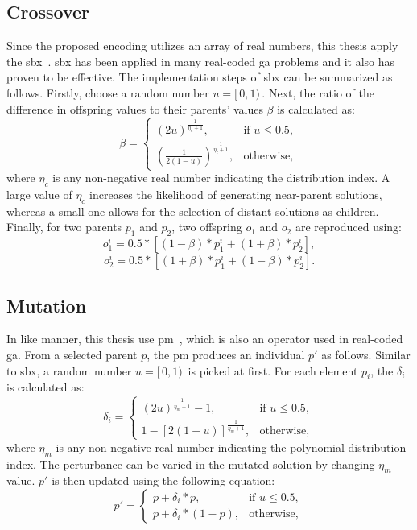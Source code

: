 \subsection{Crossover}
Since the proposed encoding utilizes an array of real numbers, this thesis apply the \gls{sbx}~\cite{deb1995simulated}. \gls{sbx} has been applied in many real-coded \gls{ga} problems and it also has proven to be effective. The implementation steps of \gls{sbx} can be summarized as follows. Firstly, choose a random number $u = [ \, 0, 1) \,$. Next, the ratio of the difference in offspring values to their parents' values $\beta$ is calculated as:
\begin{equation}
	\beta = 
	\begin{cases}
		(2u)^{\frac{1}{\eta_c + 1}}, & \text{if $u \leq 0.5$},\\
		(\frac{1}{2(1 - u)})^{\frac{1}{\eta_c + 1}}, & \text{otherwise},
	\end{cases}  
\end{equation}
where $\eta_c$ is any non-negative real number indicating the distribution index. A large value of $\eta_c$ increases the likelihood of generating near-parent solutions, whereas a small one allows for the selection of distant solutions as children. Finally, for two parents $p_1$ and $p_2$, two offspring $o_1$ and $o_2$ are reproduced using:
\begin{equation}
	o^i_1 = 0.5*[(1-\beta)*p^i_1 + (1+\beta)*p^i_2],
\end{equation}
\begin{equation}
	o^i_2 = 0.5*[(1+\beta)*p^i_1 + (1-\beta)*p^i_2].
\end{equation}

\subsection{Mutation}
In like manner, this thesis use \gls{pm}~\cite{deb2014analysing}, which is also an operator used in real-coded \gls{ga}. From a selected parent $p$, the \gls{pm} produces an individual $p'$ as follows. Similar to \gls{sbx}, a random number $u = 	[ \, 0, 1) \,$ is picked at first. For each element $p_i$, the $\delta_i$ is calculated as:
\begin{equation}
	\delta_i = 
	\begin{cases}
		(2u)^{\frac{1}{\eta_m + 1}} - 1, & \text{if $u \leq 0.5$},\\
		1 - [2(1-u)]^{\frac{1}{\eta_m + 1}}, & \text{otherwise},
	\end{cases}
\end{equation}
where $\eta_m$ is any non-negative real number indicating the polynomial distribution index. The perturbance can be varied in the mutated solution by changing $\eta_m$ value. $p'$ is then updated using the following equation:
\begin{equation}
	p' = 
	\begin{cases}
		p + \delta_i * p, & \text{if $u \leq 0.5$},\\
		p + \delta_i * (1-p), & \text{otherwise},
	\end{cases}
\end{equation}

